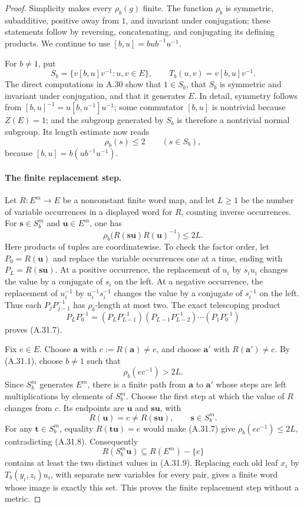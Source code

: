 \begin{proof}
Simplicity makes every $\rho_b(g)$ finite. The function
$\rho_b$ is symmetric, subadditive, positive away from $1$,
and invariant under conjugation; these statements follow
by reversing, concatenating, and conjugating its defining
products. We continue to use $[b,u]=bub^{-1}u^{-1}$.

For $b\ne1$, put
\[
 S_b=\{v[b,u]v^{-1}:u,v\in E\},\qquad
 T_b(u,v)=v[b,u]v^{-1}.
 \tag{A.31.5}
\]
The direct computations in A.30 show that $1\in S_b$,
that $S_b$ is symmetric and invariant under conjugation,
and that it generates $E$. In detail, symmetry follows
from $[b,u]^{-1}=u[b,u^{-1}]u^{-1}$; some commutator
$[b,u]$ is nontrivial because $Z(E)=1$; and the subgroup
generated by $S_b$ is therefore a nontrivial normal
subgroup. Its length estimate now reads
\[
 \rho_b(s)\leq2\qquad(s\in S_b),
 \tag{A.31.6}
\]
because $[b,u]=b(ub^{-1}u^{-1})$.

\paragraph{The finite replacement step.}
Let $R:E^m\to E$ be a nonconstant finite word map, and
let $L\geq1$ be the number of variable occurrences in a
displayed word for $R$, counting inverse occurrences.
For $\mathbf s\in S_b^m$ and $\mathbf u\in E^m$, one has
\[
 \rho_b\bigl(R(\mathbf s\mathbf u)R(\mathbf u)^{-1}\bigr)
 \leq 2L.
 \tag{A.31.7}
\]
Here products of tuples are coordinatewise. To check the
factor order, let $P_0=R(\mathbf u)$ and replace the
variable occurrences one at a time, ending with
$P_L=R(\mathbf s\mathbf u)$. At a positive occurrence,
the replacement of $u_i$ by $s_i u_i$ changes the value by
a conjugate of $s_i$ on the left. At a negative occurrence,
the replacement of $u_i^{-1}$ by $u_i^{-1}s_i^{-1}$
changes the value by a conjugate of $s_i^{-1}$ on the
left. Thus each $P_jP_{j-1}^{-1}$ has $\rho_b$-length
at most two. The exact telescoping product
\[
 P_LP_0^{-1}
 =(P_LP_{L-1}^{-1})(P_{L-1}P_{L-2}^{-1})
       \cdots(P_1P_0^{-1})
\]
proves (A.31.7).

Fix $e\in E$. Choose $\mathbf a$ with
$c:=R(\mathbf a)\ne e$, and choose $\mathbf a'$ with
$R(\mathbf a')\ne c$. By (A.31.1), choose $b\ne1$ such
that
\[
 \rho_b(ec^{-1})>2L.
 \tag{A.31.8}
\]
Since $S_b^m$ generates $E^m$, there is a finite path from
$\mathbf a$ to $\mathbf a'$ whose steps are left
multiplications by elements of $S_b^m$. Choose the first
step at which the value of $R$ changes from $c$. Its
endpoints are $\mathbf u$ and $\mathbf s\mathbf u$, with
\[
 R(\mathbf u)=c\ne R(\mathbf s\mathbf u),
 \qquad\mathbf s\in S_b^m.
 \tag{A.31.9}
\]
For any $\mathbf t\in S_b^m$, equality
$R(\mathbf t\mathbf u)=e$ would make (A.31.7) give
$\rho_b(ec^{-1})\leq2L$, contradicting (A.31.8).
Consequently
\[
 R(S_b^m\mathbf u)\subseteq R(E^m)-\{e\}
\]
contains at least the two distinct values in (A.31.9).
Replacing each old leaf $x_i$ by
$T_b(y_i,z_i)u_i$, with separate new variables for every
pair, gives a finite word whose image is exactly this set.
This proves the finite replacement step without a metric.


\end{proof}
